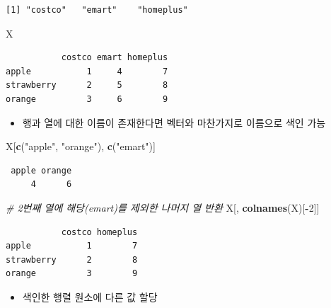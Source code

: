 \documentclass[
  11pt,
]{krantz}
\newenvironment{Shaded}{\begin{snugshade}}{\end{snugshade}}
\newcommand{\CommentTok}[1]{\textcolor[rgb]{0.37,0.37,0.37}{\textit{#1}}}
\newcommand{\DecValTok}[1]{\textcolor[rgb]{0.06,0.06,0.06}{#1}}
\newcommand{\KeywordTok}[1]{\textcolor[rgb]{0.27,0.27,0.27}{\textbf{#1}}}
\newcommand{\NormalTok}[1]{#1}
\newcommand{\OperatorTok}[1]{\textcolor[rgb]{0.43,0.43,0.43}{\textbf{#1}}}
\newcommand{\StringTok}[1]{\textcolor[rgb]{0.5,0.5,0.5}{#1}}
\providecommand{\tightlist}{%
  \setlength{\itemsep}{0pt}\setlength{\parskip}{0pt}}
\begin{document}
\begin{verbatim}
[1] "costco"   "emart"    "homeplus"
\end{verbatim}

\begin{Shaded}
\begin{Highlighting}[]
\NormalTok{X}
\end{Highlighting}
\end{Shaded}

\begin{verbatim}
           costco emart homeplus
apple           1     4        7
strawberry      2     5        8
orange          3     6        9
\end{verbatim}

\normalsize

\begin{itemize}
\tightlist
\item
  행과 열에 대한 이름이 존재한다면 벡터와 마찬가지로 이름으로 색인 가능
\end{itemize}

\footnotesize

\begin{Shaded}
\begin{Highlighting}[]
\NormalTok{X[}\KeywordTok{c}\NormalTok{(}\StringTok{"apple"}\NormalTok{, }\StringTok{"orange"}\NormalTok{), }\KeywordTok{c}\NormalTok{(}\StringTok{"emart"}\NormalTok{)]}
\end{Highlighting}
\end{Shaded}

\begin{verbatim}
 apple orange 
     4      6 
\end{verbatim}

\begin{Shaded}
\begin{Highlighting}[]
\CommentTok{# 2번째 열에 해당(emart)를 제외한 나머지 열 반환}
\NormalTok{X[, }\KeywordTok{colnames}\NormalTok{(X)[}\OperatorTok{-}\DecValTok{2}\NormalTok{]]}
\end{Highlighting}
\end{Shaded}

\begin{verbatim}
           costco homeplus
apple           1        7
strawberry      2        8
orange          3        9
\end{verbatim}

\normalsize

\begin{itemize}
\tightlist
\item
  색인한 행렬 원소에 다른 값 할당
\end{itemize}
\end{document}
